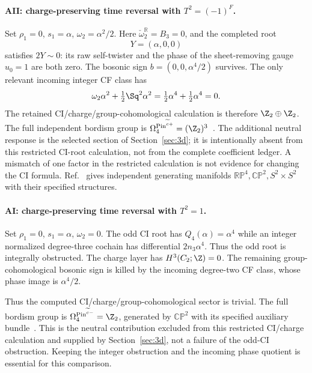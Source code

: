 \paragraph{AII: charge-preserving time reversal with $T^2=(-1)^F$.}
Set ${\rho_1}=0$, ${s_1}=\alpha$, $\omega_2=\alpha^2/2$. Here $\check\omega_2^{\mathbb R}=B_3=0$, and the completed root
\begin{equation}
                         Y=(\alpha,0,0)
\end{equation}
satisfies $2Y\sim0$: its raw self-twister and the phase of the sheet-removing gauge $u_0=1$ are both zero. The bosonic sign $b=(0,0,\alpha^4/2)$ survives. The only relevant incoming integer CF class has
\begin{equation}
       \omega_2\alpha^2+\tfrac12\Sq^2\alpha^2
                      =\tfrac12\alpha^4+\tfrac12\alpha^4=0.
\end{equation}
The retained CI/charge/group-cohomological calculation is therefore $\Z_2\oplus\Z_2$. The full independent bordism group is
$\Omega_4^{\operatorname{Pin}^{\widetilde c+}}=(\Z_2)^3$~\cite{FreedHopkins}. The additional neutral response is the selected section of Section~\ref{sec:3d}; it is intentionally absent from this restricted CI-root calculation, not from the complete coefficient ledger. A mismatch of one factor in the restricted calculation is not evidence for changing the CI formula. Ref.~\cite[Proposition~6.27]{DebrayYeYu} gives independent generating manifolds $\mathbb{RP}^4,\mathbb{CP}^2,S^2\times S^2$ with their specified structures.

\paragraph{AI: charge-preserving time reversal with $T^2=1$.}
Set ${\rho_1}=0$, ${s_1}=\alpha$, $\omega_2=0$. The odd CI root has $Q_4(\alpha)=\alpha^4$ while an integer normalized degree-three cochain has differential $2n_3\alpha^4$. Thus the odd root is integrally obstructed. The charge layer has $H^3(C_2;\Z)=0$. The remaining group-cohomological bosonic sign is killed by the incoming degree-two CF class, whose phase image is $\alpha^4/2$.

Thus the computed CI/charge/group-cohomological sector is trivial. The full bordism group is $\Omega_4^{\operatorname{Pin}^{\widetilde c-}}=\Z_2$, generated by $\mathbb{CP}^2$ with its specified auxiliary bundle~\cite{FreedHopkins,DebrayYeYu}. This is the neutral contribution excluded from this restricted CI/charge calculation and supplied by Section~\ref{sec:3d}, not a failure of the odd-CI obstruction. Keeping the integer obstruction and the incoming phase quotient is essential for this comparison.


